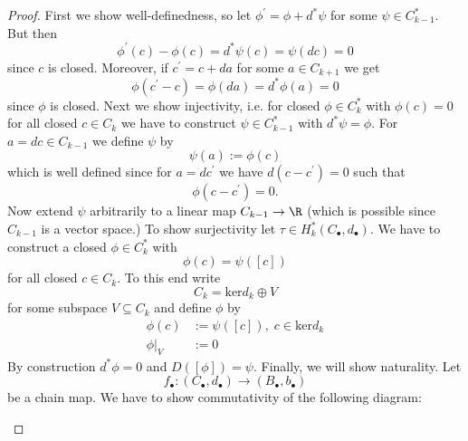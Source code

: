         \begin{proof}
            First we show well-definedness, so let $\phi^\prime = \phi + d^\ast\psi$ for some $\psi \in C_{k-1}^\ast$. But then
            \[
            \phi^\prime(c) - \phi(c) = d^\ast\psi(c) = \psi(dc) = 0
            \]
            since $c$ is closed. Moreover, if $c^\prime = c + da$ for some $a\in C_{k+1}$ we get
            \[
            \phi(c^\prime-c) = \phi(da) = d^\ast\phi(a) = 0
            \]
            since $\phi$ is closed. Next we show injectivity, i.e. for closed $\phi \in C_k^\ast$ with $\phi(c) = 0$ for all closed $c \in C_k$ we have to construct $\psi \in C_{k-1}^\ast$ with $d^\ast \psi = \phi$. For $a = dc \in C_{k-1}$ we define $\psi$ by 
            \[
            \psi(a) := \phi(c)
            \]
            which is well defined since for $a = dc^\prime$ we have $d(c-c^\prime) = 0$ such that
            \[
            \phi(c-c^\prime) = 0.
            \]
            Now extend $\psi$ arbitrarily to a linear map $C_{k-1} \to \R$ (which is possible since $C_{k-1}$ is a vector space.)
            To show surjectivity let $\tau \in H_k^\ast(C_\bullet,d_\bullet)$. We have to construct a closed $\phi \in C_k^\ast$ with 
            \[
            \phi(c) = \psi([c])
            \]
            for all closed $c \in C_k$. To this end write
            \[
            C_k = \mathrm{ker}d_k \oplus V
            \]
            for some subspace $V \subseteq C_k$ and define $\phi$ by
            \begin{align*}
                \phi(c) &:= \psi([c]), \; c \in \mathrm{ker}d_k \\
                \phi|_V &:= 0
            \end{align*}
            By construction $d^\ast\phi = 0$ and $D([\phi]) = \psi$. Finally, we will show naturality. Let 
            \[
            f_\bullet \colon (C_\bullet,d_\bullet) \to (B_\bullet,b_\bullet)
            \]
            be a chain map. We have to show commutativity of the following diagram:
            \begin{center}
\end{center}
\end{proof}
